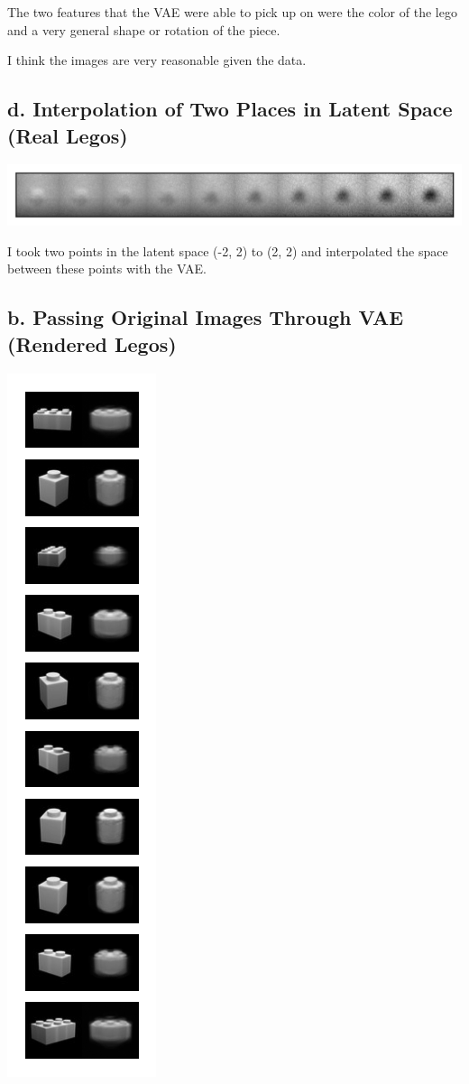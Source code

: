 \documentclass[]{article}
\begin{document}
The two features that the VAE were able to pick up on were the color
of the lego and a very general shape or rotation of the piece.

I think the images are very reasonable given the data.

\subsection*{d. Interpolation of Two Places in Latent Space (Real Legos)}
\begin{center}
  \includegraphics[scale=0.9]{interpolation-lego-dataset}
\end{center}

I took two points in the latent space (-2, 2) to (2, 2) and interpolated
the space between these points with the VAE.


\subsection*{b. Passing Original Images Through VAE (Rendered Legos)}
\begin{center}
  \includegraphics[scale=1]{10_original-lego-blender-4}
\end{center}
\end{document}
